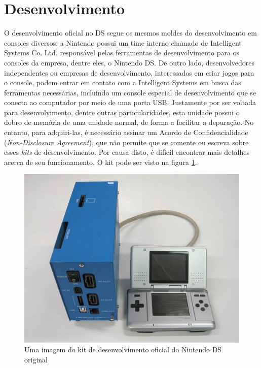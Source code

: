 \documentclass[brazil]{abnt}
\begin{document}
\section{Desenvolvimento}

O desenvolvimento oficial no DS segue os mesmos moldes do desenvolvimento em consoles diversos: a Nintendo possui um time interno chamado de Intelligent Systems Co. Ltd. \cite{IntelligentSystems} responsável pelas ferramentas de desenvolvimento para os consoles da empresa, dentre eles, o Nintendo DS. De outro lado, desenvolvedores independentes ou empresas de desenvolvimento, interessados em criar jogos para o console, podem entrar em contato com a Intelligent Systems em busca das ferramentas necessárias, incluindo um console especial de desenvolvimento que se conecta ao computador por meio de uma porta USB. Justamente por ser voltada para desenvolvimento, dentre outras particularidades, esta unidade possui o dobro de memória de uma unidade normal, de forma a facilitar a depuração. No entanto, para adquiri-las, é necessário assinar um Acordo de Confidencialidade (\textit{Non-Disclosure Agreement}), que não permite que se comente ou escreva sobre esses \textit{kits} de desenvolvimento. Por causa disto, é difícil encontrar mais detalhes acerca de seu funcionamento. O kit pode ser visto na figura \ref{fig:kitdev}.

\begin{figure}
\centering
\includegraphics{imgs/is_devkit1.jpg}
\caption{Uma imagem do kit de desenvolvimento oficial do Nintendo DS original}
\label{fig:kitdev}
\end{figure}
\end{document}
